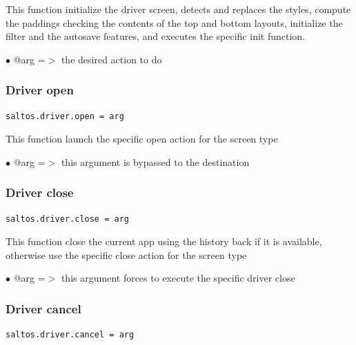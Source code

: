 \documentclass[a4paper]{article}
\begin{document}
This function initialize the driver screen, detects and replaces the styles, compute
the paddings checking the contents of the top and bottom layouts, initialize the filter
and the autosave features, and executes the specific init function.

\begin{compactitem}
\item[\color{myblue}$\bullet$] @arg =$>$ the desired action to do
\end{compactitem}

\hypertarget{toc168}{}
\subsubsection{Driver open}

\begin{lstlisting}
saltos.driver.open = arg
\end{lstlisting}

This function launch the specific open action for the screen type

\begin{compactitem}
\item[\color{myblue}$\bullet$] @arg =$>$ this argument is bypassed to the destination
\end{compactitem}

\hypertarget{toc169}{}
\subsubsection{Driver close}

\begin{lstlisting}
saltos.driver.close = arg
\end{lstlisting}

This function close the current app using the history back if it is available,
otherwise use the specific close action for the screen type

\begin{compactitem}
\item[\color{myblue}$\bullet$] @arg =$>$ this argument forces to execute the specific driver close
\end{compactitem}

\hypertarget{toc170}{}
\subsubsection{Driver cancel}

\begin{lstlisting}
saltos.driver.cancel = arg
\end{lstlisting}
\end{document}
